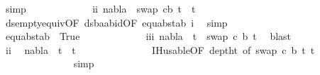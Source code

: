 \begin{isabellebody}
\ simp\isanewline
\ \ \ \ \ \ \ \ \ \ \ \isamarkupfalse%
\ ii{\isacharcolon}{\kern0pt}\ {\isachardoublequoteopen}nabla\ {\isasymturnstile}\ swap\ {\isacharbrackleft}{\kern0pt}{\isacharparenleft}{\kern0pt}c{\isacharcomma}{\kern0pt}b{\isacharparenright}{\kern0pt}{\isacharbrackright}{\kern0pt}\ t{}{\isacharprime}{\kern0pt}\ {\isasymapprox}\ t{}{\isacharprime}{\kern0pt}{\isachardoublequoteclose}\isanewline
\ \ \ \ \ \ \ \ \ \ \ \ \ \isamarkupfalse%
\ ds{\isacharunderscore}{\kern0pt}empty{\isacharunderscore}{\kern0pt}equiv{\isacharunderscore}{\kern0pt}{}{\isacharbrackleft}{\kern0pt}OF\ ds{\isacharunderscore}{\kern0pt}baab{\isacharunderscore}{\kern0pt}id{\isacharbrackleft}{\kern0pt}OF\ equ{\isacharunderscore}{\kern0pt}abst{\isacharunderscore}{\kern0pt}ab{\isacharparenleft}{\kern0pt}{}{\isacharparenright}{\kern0pt}{\isacharbrackright}{\kern0pt}\ i{\isacharbrackright}{\kern0pt}\ \isamarkupfalse%
\ simp\isanewline
\ \ \ \ \ \ \ \ \ \ \ \isamarkupfalse%
\ equ{\isacharunderscore}{\kern0pt}abst{\isacharunderscore}{\kern0pt}ab\ {}\ True\isanewline
\ \ \ \ \ \ \ \ \ \ \ \isamarkupfalse%
\ iii{\isacharcolon}{\kern0pt}\ {\isachardoublequoteopen}nabla\ {\isasymturnstile}\ t{}{\isacharprime}{\kern0pt}\ {\isasymapprox}\ swap\ {\isacharbrackleft}{\kern0pt}{\isacharparenleft}{\kern0pt}c{\isacharcomma}{\kern0pt}\ b{\isacharparenright}{\kern0pt}{\isacharbrackright}{\kern0pt}\ t{}{\isacharprime}{\kern0pt}{\isachardoublequoteclose}\ \isamarkupfalse%
\ blast\isanewline
\ \ \ \ \ \ \ \ \ \ \ \isamarkupfalse%
\ ii\ \isamarkupfalse%
\ {\isachardoublequoteopen}nabla\ {\isasymturnstile}\ t{}{\isacharprime}{\kern0pt}\ {\isasymapprox}\ t{}{\isacharprime}{\kern0pt}{\isachardoublequoteclose}\isanewline
\ \ \ \ \ \ \ \ \ \ \ \ \ \isamarkupfalse%
\ IH{\isacharunderscore}{\kern0pt}usable{\isacharbrackleft}{\kern0pt}OF\ deptht{}{\isacharcomma}{\kern0pt}\ of\ {\isacartoucheopen}swap\ {\isacharbrackleft}{\kern0pt}{\isacharparenleft}{\kern0pt}c{\isacharcomma}{\kern0pt}\ b{\isacharparenright}{\kern0pt}{\isacharbrackright}{\kern0pt}\ t{}{\isacharprime}{\kern0pt}{\isacartoucheclose}\ t{}{\isacharprime}{\kern0pt}{\isacharbrackright}{\kern0pt}\ {}{\isacharparenleft}{\kern0pt}{}{\isacharparenright}{\kern0pt}\isanewline
\ \ \ \ \ \ \ \ \ \ \ \ \ \isamarkupfalse%
\ simp\isanewline

\end{isabellebody}
